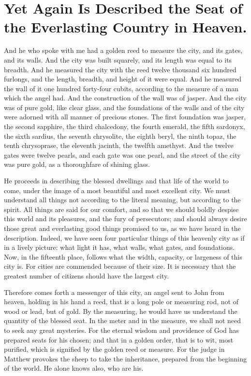 \chapter[Sermon 94. Yet Again Is Described the Seat of the Everlasting Country in Heaven.]{Yet Again Is Described the Seat of the Everlasting Country in Heaven.}
\label{sermon:094}

And he who spoke with me had a golden reed to measure the city, and its gates, and its walls. And the city was built squarely, and its length was equal to its breadth. And he measured the city with the reed twelve thousand six hundred furlongs, and the length, breadth, and height of it were equal. And he measured the wall of it one hundred forty-four cubits, according to the measure of a man which the angel had. And the construction of the wall was of jasper. And the city was of pure gold, like clear glass, and the foundations of the walls and of the city were adorned with all manner of precious stones. The first foundation was jasper, the second sapphire, the third chalcedony, the fourth emerald, the fifth sardonyx, the sixth sardius, the seventh chrysolite, the eighth beryl, the ninth topaz, the tenth chrysoprase, the eleventh jacinth, the twelfth amethyst. And the twelve gates were twelve pearls, and each gate was one pearl, and the street of the city was pure gold, as a thoroughfare of shining glass.

He proceeds in describing the blessed dwellings and that life of the world to come, under the image of a most beautiful and most excellent city. We must understand all things not according to the literal meaning, but according to the spirit. All things are said for our comfort, and so that we should boldly despise this world and its pleasures, and the fury of persecutors; and should always desire those great and everlasting good things promised to us, as we have heard in the description. Indeed, we have seen four particular things of this heavenly city as if in a lively picture: what light it has, what walls, what gates, and foundations. Now, in the fifteenth place, follows what the width, capacity, or largeness of this city is. For cities are commended because of their size. It is necessary that the greatest number of citizens should have the largest city.

Therefore comes forth a messenger of this city, an angel sent to John from heaven, holding in his hand a reed, that is a long pole or measuring rod, not of wood or lead, but of gold. By the measuring, he would have us understand the quantity of the blessed seat. In the meter and in the measure, we shall not need to seek any great mysteries. For the eternal wisdom and providence of God has prepared seats for his chosen; and that in a golden order, that is to wit, most purified, which is signified by the golden reed or measure. For the judge in Matthew provokes the sheep to take the inheritance, prepared from the beginning of the world. He alone knows also, who are his.

